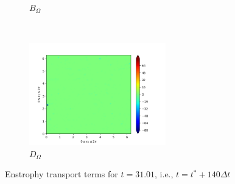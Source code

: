 \begin{figure}[H]
\begin{subfigure}{0.45\textwidth}
        \caption{$B_{\Omega}$}
    \end{subfigure}
    ~
    \begin{subfigure}{0.45\textwidth}
        \includegraphics[height=1.75in]{media/run-cds-65/D-enst-1480.png}
        \caption{$D_{\Omega}$}
    \end{subfigure}
    \caption{Enstrophy transport terms for $t=31.01$, i.e., $t=t^{\ast} + 140 \Delta t$}
\end{figure}

\newpage

